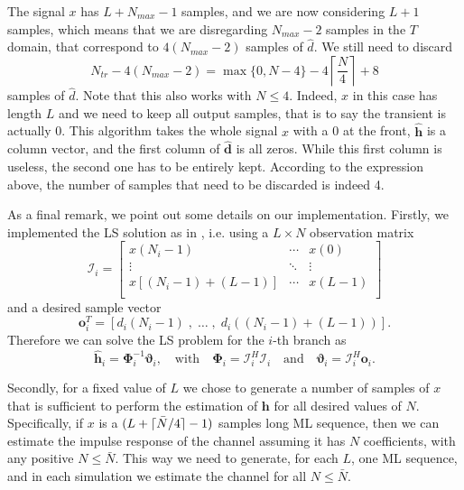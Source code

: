 \documentclass[10pt]{article}
\DeclarePairedDelimiter{\ceil}{\lceil}{\rceil}
\begin{document}
The signal $x$ has $L+N_{max}-1$ samples, and we are now considering $L+1$ samples, which means that we are disregarding $N_{max}-2$ samples in the $T$ domain, that correspond to $4(N_{max}-2)$ samples of $\hat{d}$. We still need to discard
\begin{equation}\label{eq:transientlen_dhat}
N_{tr} - 4(N_{max}-2) = \max \{ 0, N-4 \} - 4 \left\lceil \frac{N}{4} \right\rceil + 8
\end{equation}
samples of $\hat{d}$. Note that this also works with $N \leq 4$. Indeed, $x$ in this case has length $L$ and we need to keep all output samples, that is to say the transient is actually 0.
This algorithm takes the whole signal $x$ with a 0 at the front, $\hat{\mathbf{h}}$ is a column vector, and the first column of $\hat{\mathbf{d}}$ is all zeros. While this first column is useless, the second one has to be entirely kept. According to the expression above, the number of samples that need to be discarded is indeed 4.

As a final remark, we point out some details on our implementation. Firstly, we implemented the LS solution as in \cite[p.~246]{bc}, i.e. using a $L \times N$ observation matrix
\begin{equation}
	\boldsymbol{\mathcal{I}}_i =
 \begin{bmatrix}
  x(N_i-1) & \cdots & x(0) \\
  \vdots  & \ddots & \vdots  \\
x[(N_i-1)+(L-1)] & \cdots & x(L-1) \\
 \end{bmatrix}
\end{equation}
and a desired sample vector
\begin{equation}
\mathbf{o}_i^T = \left[ d_i(N_i-1)\;,\; \ldots\; , \;d_i((N_i-1)+(L-1)) \right].
\end{equation}
Therefore we can solve the LS problem for the $i$-th branch as
\begin{equation}
	\hat{\mathbf{h}}_i = \mathbf{\Phi}_i^{-1} \boldsymbol{\vartheta}_i, \quad\mathrm{ with } \quad \mathbf{\Phi}_i=\boldsymbol{\mathcal{I}}_i^H \boldsymbol{\mathcal{I}}_i \quad \mathrm{ and }\quad \boldsymbol{\vartheta}_i = \boldsymbol{\mathcal{I}}_i^H \mathbf{o}_i.
\end{equation}

Secondly, for a fixed value of $L$ we chose to generate a number of samples of $x$ that is sufficient to perform the estimation of $\mathbf{h}$ for all desired values of $N$. Specifically, if $x$ is a $(L+\ceil{\bar{N}/4} - 1)$ samples long ML sequence, then we can estimate the impulse response of the channel assuming it has $N$ coefficients, with any positive $N \leq \bar{N}$. This way we need to generate, for each $L$, one ML sequence, and in each simulation we estimate the channel for all $N \leq \bar{N}$.
\end{document}

